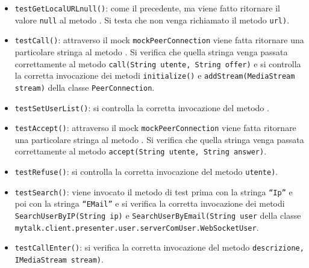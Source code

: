 {\begin{sloppypar}
{\begin{itemize}
\begin{itemize}
\begin{itemize}
						\item \texttt{testGetLocalURLnull()}: come il precedente, ma viene fatto ritornare il valore \texttt{null} al metodo . Si testa che non venga richiamato il metodo  \texttt{url)}.
						
						\item \texttt{testCall()}: attraverso il mock \texttt{mockPeerConnection} viene fatta ritornare una particolare stringa al metodo . Si verifica che quella stringa venga passata correttamente al metodo  \texttt{call(String utente, String offer)} e si controlla la corretta invocazione dei metodi \texttt{initialize()} e \texttt{addStream(MediaStream stream)} della classe \texttt{PeerConnection}.
						
						\item \texttt{testSetUserList()}: si controlla la corretta invocazione del metodo .
						
						\item \texttt{testAccept()}: attraverso il mock \texttt{mockPeerConnection} viene fatta ritornare una particolare stringa al metodo . Si verifica che quella stringa venga passata correttamente al metodo  \texttt{accept(String utente, String answer)}.
						
						\item \texttt{testRefuse()}: si controlla la corretta invocazione del metodo  \texttt{utente)}.
						
						\item \texttt{testSearch()}: viene invocato il metodo di test prima con la stringa \texttt{``Ip''} e poi con la stringa \texttt{``EMail''} e si verifica la corretta invocazione dei metodi \texttt{SearchUserByIP(String ip)} e \texttt{SearchUserByEmail(String user} della classe \texttt{mytalk.client.presenter.user.serverComUser.WebSocketUser}.
						
						\item \texttt{testCallEnter()}: si verifica la corretta invocazione del metodo  \texttt{descrizione, IMediaStream stream)}.
						

\end{itemize}
\end{itemize}
\end{itemize}}
\end{sloppypar}}

